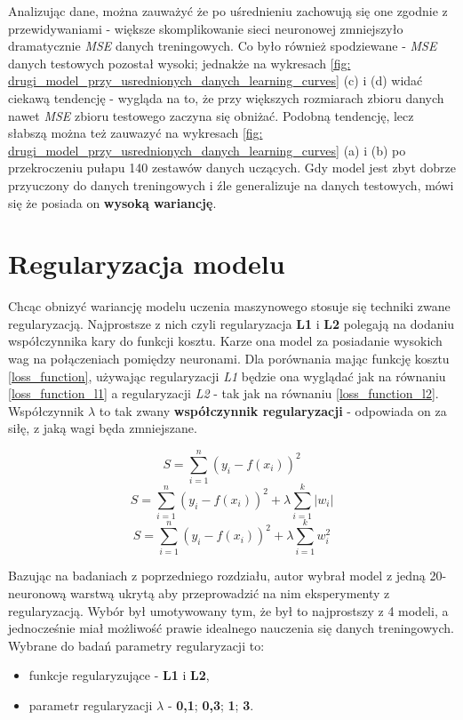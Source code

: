 \documentclass[12pt]{aghdpl}
\begin{document}
		Analizując dane, można zauważyć że po uśrednieniu zachowują się one zgodnie z przewidywaniami - większe skomplikowanie sieci neuronowej zmniejszyło dramatycznie \textit{MSE} danych treningowych. Co było również spodziewane - \textit{MSE} danych testowych pozostał wysoki; jednakże na wykresach \ref{fig: drugi_model_przy_usrednionych_danych_learning_curves} (c) i (d) widać ciekawą tendencję - wygląda na to, że przy większych rozmiarach zbioru danych nawet \textit{MSE} zbioru testowego zaczyna się obniżać. Podobną tendencję, lecz słabszą można też zauwazyć na wykresach \ref{fig: drugi_model_przy_usrednionych_danych_learning_curves} (a) i (b) po przekroczeniu pułapu 140 zestawów danych uczących. Gdy model jest zbyt dobrze przyuczony do danych treningowych i źle generalizuje na danych testowych, mówi się że posiada on \textbf{wysoką wariancję}.
		
		\section{Regularyzacja modelu} \label{regularyzacja_modelu}
		Chcąc obnizyć wariancję modelu uczenia maszynowego stosuje się techniki zwane regularyzacją. Najprostsze z nich czyli regularyzacja \textbf{L1} i \textbf{L2} polegają na dodaniu współczynnika kary do funkcji kosztu. Karze ona model za posiadanie wysokich wag na połączeniach pomiędzy neuronami. Dla porównania mając funkcję kosztu \ref{loss_function}, używając regularyzacji \textit{L1} będzie ona wyglądać jak na równaniu \ref{loss_function_l1} a regularyzacji \textit{L2} - tak jak na równaniu \ref{loss_function_l2}. Współczynnik $\lambda$ to tak zwany \textbf{współczynnik regularyzacji} - odpowiada on za siłę, z jaką wagi będa zmniejszane.
		
		\begin{equation} \label{loss_function}
		S = \sum_{i = 1}^n (y_i - f(x_i))^2
		\end{equation}
		\begin{equation} \label{loss_function_l1}
		S = \sum_{i = 1}^n (y_i - f(x_i))^2 + \lambda \sum_{i = 1}^k |w_i|
		\end{equation}
		\begin{equation} \label{loss_function_l2}
		S = \sum_{i = 1}^n (y_i - f(x_i))^2 + \lambda \sum_{i = 1}^k w_i^2
		\end{equation}
		
		Bazując na badaniach z poprzedniego rozdziału, autor wybrał model z jedną 20-neuronową warstwą ukrytą aby przeprowadzić na nim eksperymenty z regularyzacją. Wybór był umotywowany tym, że był to najprostszy z 4 modeli, a jednocześnie miał możliwość prawie idealnego nauczenia się danych treningowych. Wybrane do badań parametry regularyzacji to:
		\begin{itemize}
		\item funkcje regularyzujące - \textbf{L1} i \textbf{L2},
		\item parametr regularyzacji $\lambda$ - \textbf{0,1}; \textbf{0,3}; \textbf{1}; \textbf{3}.
		\end{itemize}
		
\end{document}
